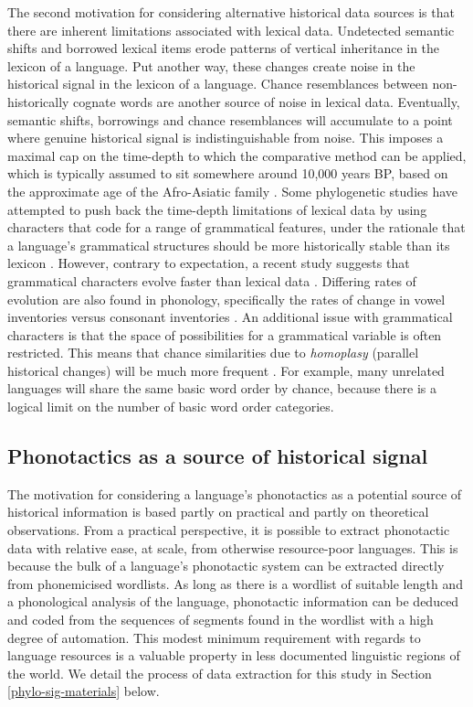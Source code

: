 The second motivation for considering alternative historical data sources is that there are inherent limitations associated with lexical data. Undetected semantic shifts and borrowed lexical items erode patterns of vertical inheritance in the lexicon of a language. Put another way, these changes create noise in the historical signal in the lexicon of a language. Chance resemblances between non-historically cognate words are another source of noise in lexical data. Eventually, semantic shifts, borrowings and chance resemblances will accumulate to a point where genuine historical signal is indistinguishable from noise. This imposes a maximal cap on the time-depth to which the comparative method can be applied, which is typically assumed to sit somewhere around 10,000 years BP, based on the approximate age of the Afro-Asiatic family \autocite[p.~135]{nichols_sprung_1997}. Some phylogenetic studies have attempted to push back the time-depth limitations of lexical data by using characters that code for a range of grammatical features, under the rationale that a language's grammatical structures should be more historically stable than its lexicon \autocites{dunn_structural_2005}{rexova_cladistic_2006}. However, contrary to expectation, a recent study suggests that grammatical characters evolve faster than lexical data \autocite{greenhill_evolutionary_2017}. Differing rates of evolution are also found in phonology, specifically the rates of change in vowel inventories versus consonant inventories \autocites{moran_differential_2018}{moran_investigating_2020}. An additional issue with grammatical characters is that the space of possibilities for a grammatical variable is often restricted. This means that chance similarities due to \emph{homoplasy} (parallel historical changes) will be much more frequent \autocite[cf.][]{chang_ancestry-constrained_2015}. For example, many unrelated languages will share the same basic word order by chance, because there is a logical limit on the number of basic word order categories.

\hypertarget{why-phonotactics}{%
\subsection{Phonotactics as a source of historical signal}\label{why-phonotactics}}

The motivation for considering a language's phonotactics as a potential source of historical information is based partly on practical and partly on theoretical observations. From a practical perspective, it is possible to extract phonotactic data with relative ease, at scale, from otherwise resource-poor languages. This is because the bulk of a language's phonotactic system can be extracted directly from phonemicised wordlists. As long as there is a wordlist of suitable length \autocite{dockum_swadesh_2019} and a phonological analysis of the language, phonotactic information can be deduced and coded from the sequences of segments found in the wordlist with a high degree of automation. This modest minimum requirement with regards to language resources is a valuable property in less documented linguistic regions of the world. We detail the process of data extraction for this study in Section \ref{phylo-sig-materials} below.

